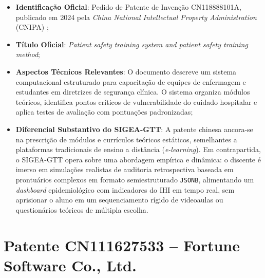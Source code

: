 \begin{itemize}
    \item \textbf{Identificação Oficial}: Pedido de Patente de Invenção CN118888101A, publicado em 2024 pela \textit{China National Intellectual Property Administration} (CNIPA) \cite{patente_cn118888101};
    \item \textbf{Título Oficial}: \textit{Patient safety training system and patient safety training method};
    \item \textbf{Aspectos Técnicos Relevantes}: O documento descreve um sistema computacional estruturado para capacitação de equipes de enfermagem e estudantes em diretrizes de segurança clínica. O sistema organiza módulos teóricos, identifica pontos críticos de vulnerabilidade do cuidado hospitalar e aplica testes de avaliação com pontuações padronizadas;
    \item \textbf{Diferencial Substantivo do SIGEA-GTT}: A patente chinesa ancora-se na prescrição de módulos e currículos teóricos estáticos, semelhantes a plataformas tradicionais de ensino a distância (\textit{e-learning}). Em contrapartida, o SIGEA-GTT opera sobre uma abordagem empírica e dinâmica: o discente é imerso em simulações realistas de auditoria retrospectiva baseada em prontuários complexos em formato semiestruturado \texttt{JSONB}, alimentando um \textit{dashboard} epidemiológico com indicadores do IHI em tempo real, sem aprisionar o aluno em um sequenciamento rígido de videoaulas ou questionários teóricos de múltipla escolha.
\end{itemize}

\section{Patente CN111627533 -- Fortune Software Co., Ltd.}
\label{sec_patente_fortune}

